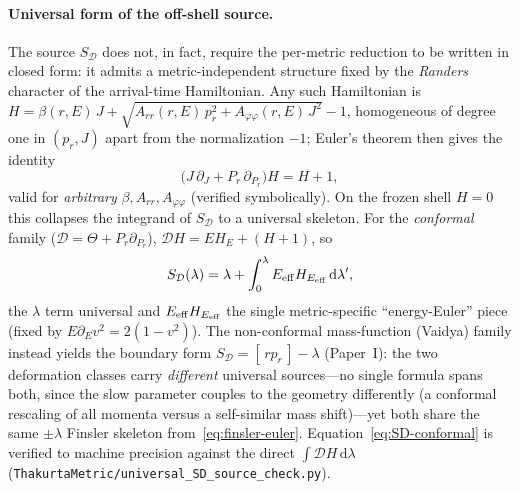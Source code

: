 \documentclass[12pt]{iopart}
\theoremstyle{plain}
\theoremstyle{definition}
\theoremstyle{remark}
\newcommand{\dd}{\mathrm{d}}
\begin{document}
\paragraph{Universal form of the off-shell source.} The source $S_{\mathcal D}$ does
not, in fact, require the per-metric reduction to be written in closed form: it admits
a metric-independent structure fixed by the \emph{Randers} character of the
arrival-time Hamiltonian. Any such Hamiltonian is
$H=\beta(r,E)\,J+\sqrt{A_{rr}(r,E)\,p_r^2+A_{\varphi\varphi}(r,E)\,J^2}-1$, homogeneous
of degree one in $(p_r,J)$ apart from the normalization $-1$; Euler's theorem then
gives the identity
\begin{equation}
    \big(J\,\partial_J+P_r\,\partial_{P_r}\big)H=H+1,
    \label{eq:finsler-euler}
\end{equation}
valid for \emph{arbitrary} $\beta,A_{rr},A_{\varphi\varphi}$ (verified symbolically).
On the frozen shell $H=0$ this collapses the integrand of $S_{\mathcal D}$ to a
universal skeleton. For the \emph{conformal} family ($\mathcal D=\Theta+P_r\partial_{P_r}$),
$\mathcal D H=E H_E+(H+1)$, so
\begin{equation}
    S_{\mathcal D}(\lambda)=\lambda+\int_0^{\lambda}E_{\rm eff}H_{E_{\rm eff}}\,\dd\lambda',
    \label{eq:SD-conformal}
\end{equation}
the $\lambda$ term universal and $E_{\rm eff}H_{E_{\rm eff}}$ the single
metric-specific ``energy-Euler'' piece (fixed by $E\partial_E v^2=2(1-v^2)$). The
non-conformal mass-function (Vaidya) family instead yields the boundary form
$S_{\mathcal D}=[\,rp_r\,]-\lambda$ (Paper~I): the two deformation classes carry
\emph{different} universal sources---no single formula spans both, since the slow
parameter couples to the geometry differently (a conformal rescaling of all momenta
versus a self-similar mass shift)---yet both share the same $\pm\lambda$ Finsler skeleton
from~\eqref{eq:finsler-euler}. Equation~\eqref{eq:SD-conformal} is verified to machine
precision against the direct $\int\mathcal D H\,\dd\lambda$
(\texttt{ThakurtaMetric/universal\_SD\_source\_check.py}).
\end{document}
